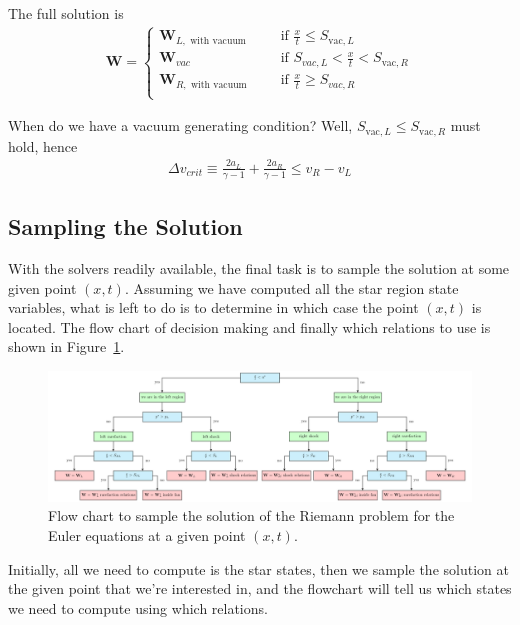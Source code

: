 \begin{enumerate}
		The full solution is
		\begin{align}
		\mathbf{W} =
			\begin{cases}
			\mathbf{W}_{L, \text{ with vacuum }} &
				\quad \text{ if } \frac{x}{t} \leq S_{\mathrm{vac}, L}\\
			\mathbf{W}_{vac} &
				\quad \text{ if }
					S_{vac, L} < \frac{x}{t} <  S_{\mathrm{vac}, R}\\
			\mathbf{W}_{R, \text{ with vacuum }} &
				\quad \text{ if } \frac{x}{t} \geq S_{vac, R} \\
			\end{cases}
		\end{align}
		
		
		When do we have a vacuum generating condition? Well,
		$S_{\mathrm{vac}, L} \leq S_{\mathrm{vac}, R}$ must hold, hence
		\begin{align}
		\Delta v_{crit} \equiv
			\frac{2 a_L}{\gamma - 1 } + \frac{2 a_R}{\gamma - 1 }
			\leq v_R - v_L
		\label{eq:vacuum-generating-condition}
		\end{align}

\end{enumerate}




















\subsection{Sampling the Solution}\label{chap:sampling-solution}

With the solvers readily available, the final task is to sample the solution at
some given point $(x, t)$. Assuming we have computed all the star region state
variables, what is left to do is to determine in which case the point $(x, t)$
is located. The flow chart of decision making and finally which relations to
use is shown in Figure~\ref{fig:sampling-solution}.


\begin{figure}
	\includegraphics[]{./figures/tikz/sampling_the_solution.pdf}%
	\caption{
Flow chart to sample the solution of the Riemann problem for the Euler
equations at a given point $(x, t)$.
\label{fig:sampling-solution}
	}
\end{figure}

Initially, all we need to compute is the star states, then we sample the
solution at the given point that we're interested in, and the flowchart will
tell us which states we need to compute using which relations.



